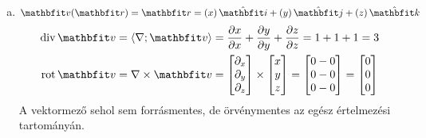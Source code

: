 \documentclass{szb-solution}
\begin{document}
\begin{enumerate}[a)]
  \item $\rvec v(\coordvec) = \coordvec = \ijk{x}{y}{z}$
        \begin{align*}
          \Div \rvec v
           & = \scalar{\nabla}{\rvec v}
          = \pdv{x}{x} + \pdv{y}{y} + \pdv{z}{z}
          = 1 + 1 + 1 = 3
          \\
          \rot \rvec v
           & = \nabla \times \rvec v
          = \begin{bmatrix}
              \partial_x \\ \partial_y \\ \partial_z
            \end{bmatrix} \times \begin{bmatrix}
                                   x \\ y \\ z
                                 \end{bmatrix} = \begin{bmatrix}
                                                   0 - 0 \\ 0 - 0 \\ 0 - 0
                                                 \end{bmatrix} = \begin{bmatrix}
                                                                   0 \\ 0 \\ 0
                                                                 \end{bmatrix}
        \end{align*}
        A vektormező sehol sem forrásmentes, de örvénymentes az egész
        értelmezési tartományán.


\end{enumerate}
\end{document}
